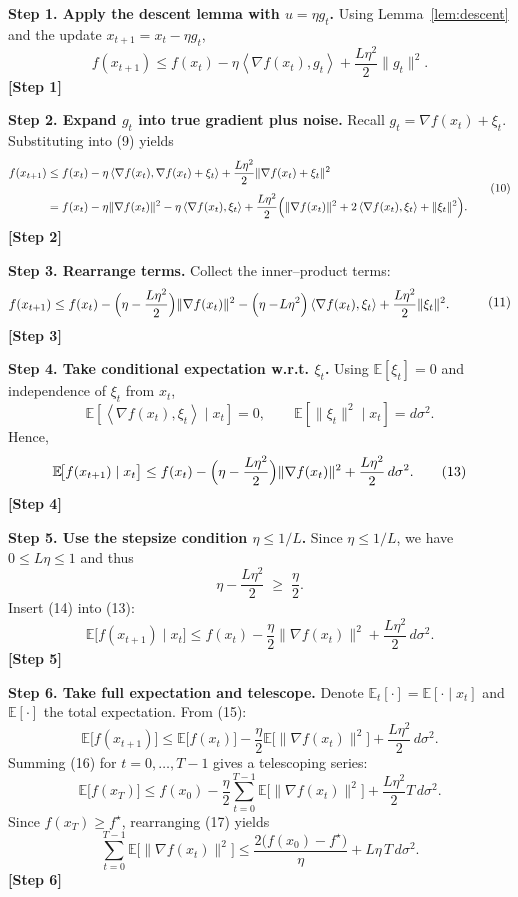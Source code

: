 \documentclass{article}
\newcommand{\E}{\mathbb{E}}
\newcommand{\ip}[2]{\left\langle #1,#2\right\rangle}
\begin{document}
\bigskip
\noindent\textbf{Step 1. Apply the descent lemma with $u=\eta g_{t}$.}  
Using Lemma~\ref{lem:descent} and the update $x_{t+1}=x_{t}-\eta g_{t}$,
\[
f(x_{t+1})\le f(x_{t})-\eta\ip{\nabla f(x_{t})}{g_{t}}+\frac{L\eta^{2}}{2}\|g_{t}\|^{2}.
\tag{9}
\]
\textbf{[Step 1]}

\bigskip
\noindent\textbf{Step 2. Expand $g_{t}$ into true gradient plus noise.}  
Recall $g_{t}= \nabla f(x_{t})+\xi_{t}$. Substituting into (9) yields
\[
\begin{aligned}
f(x_{t+1})
&\le f(x_{t})
-\eta\ip{\nabla f(x_{t})}{\nabla f(x_{t})+\xi_{t}}
+\frac{L\eta^{2}}{2}\|\nabla f(x_{t})+\xi_{t}\|^{2}\\[4pt]
&= f(x_{t})
-\eta\|\nabla f(x_{t})\|^{2}
-\eta\ip{\nabla f(x_{t})}{\xi_{t}}
+\frac{L\eta^{2}}{2}\Bigl(\|\nabla f(x_{t})\|^{2}
+2\ip{\nabla f(x_{t})}{\xi_{t}}
+\|\xi_{t}\|^{2}\Bigr).
\end{aligned}
\tag{10}
\]
\textbf{[Step 2]}

\bigskip
\noindent\textbf{Step 3. Rearrange terms.}  
Collect the inner–product terms:
\[
\begin{aligned}
f(x_{t+1})
&\le f(x_{t})
-\Bigl(\eta-\frac{L\eta^{2}}{2}\Bigr)\|\nabla f(x_{t})\|^{2}
-\Bigl(\eta-\!L\eta^{2}\Bigr)\ip{\nabla f(x_{t})}{\xi_{t}}
+\frac{L\eta^{2}}{2}\|\xi_{t}\|^{2}.
\end{aligned}
\tag{11}
\]
\textbf{[Step 3]}

\bigskip
\noindent\textbf{Step 4. Take conditional expectation w.r.t. $\xi_{t}$.}  
Using $\E[\xi_{t}]=0$ and independence of $\xi_{t}$ from $x_{t}$,
\[
\E\!\left[\ip{\nabla f(x_{t})}{\xi_{t}}\;\big|\;x_{t}\right]=0,
\qquad
\E\!\left[\|\xi_{t}\|^{2}\;\big|\;x_{t}\right]=d\sigma^{2}.
\tag{12}
\]
Hence,
\[
\E\!\bigl[f(x_{t+1})\mid x_{t}\bigr]
\le f(x_{t})
-\Bigl(\eta-\frac{L\eta^{2}}{2}\Bigr)\|\nabla f(x_{t})\|^{2}
+\frac{L\eta^{2}}{2}\,d\sigma^{2}.
\tag{13}
\]
\textbf{[Step 4]}

\bigskip
\noindent\textbf{Step 5. Use the stepsize condition $\eta\le 1/L$.}  
Since $\eta\le 1/L$, we have $0\le L\eta\le 1$ and thus
\[
\eta-\frac{L\eta^{2}}{2}
\;\ge\;
\frac{\eta}{2}.
\tag{14}
\]
Insert (14) into (13):
\[
\E\!\bigl[f(x_{t+1})\mid x_{t}\bigr]
\le f(x_{t})
-\frac{\eta}{2}\|\nabla f(x_{t})\|^{2}
+\frac{L\eta^{2}}{2}\,d\sigma^{2}.
\tag{15}
\]
\textbf{[Step 5]}

\bigskip
\noindent\textbf{Step 6. Take full expectation and telescope.}  
Denote $\E_{t}[\cdot]=\E[\cdot\mid x_{t}]$ and $\E[\cdot]$ the total expectation.  
From (15):
\[
\E\!\bigl[f(x_{t+1})\bigr]
\le \E\!\bigl[f(x_{t})\bigr]
-\frac{\eta}{2}\E\!\bigl[\|\nabla f(x_{t})\|^{2}\bigr]
+\frac{L\eta^{2}}{2}\,d\sigma^{2}.
\tag{16}
\]
Summing (16) for $t=0,\dots,T-1$ gives a telescoping series:
\[
\E\!\bigl[f(x_{T})\bigr]
\le f(x_{0})
-\frac{\eta}{2}\sum_{t=0}^{T-1}\E\!\bigl[\|\nabla f(x_{t})\|^{2}\bigr]
+\frac{L\eta^{2}}{2}T\,d\sigma^{2}.
\tag{17}
\]
Since $f(x_{T})\ge f^{\star}$, rearranging (17) yields
\[
\sum_{t=0}^{T-1}\E\!\bigl[\|\nabla f(x_{t})\|^{2}\bigr]
\le
\frac{2\bigl(f(x_{0})-f^{\star}\bigr)}{\eta}
+L\eta\,T\,d\sigma^{2}.
\tag{18}
\]
\textbf{[Step 6]}
\end{document}
